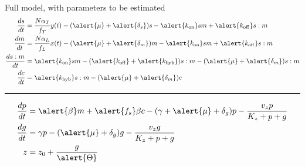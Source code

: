 \documentclass{beamer}
\begin{document}
\small
\begin{frame}{Full model, with parameters to be estimated}
\begin{align} 
\frac{ds}{dt} &= \frac{N\alpha_{T}}{f_{T}} y(t)-(\alert{\mu} + \alert{\delta_{s}})s -\alert{k_{\mathrm{on}}}sm +\alert{k_{\mathrm{off}}}s:m \\
\frac{dm}{dt} &=  \frac{N\alpha_{L}}{f_{L}}x(t)-(\alert{\mu} + \alert{\delta_{m}})m -\alert{k_{\mathrm{on}}}sm +\alert{k_{\mathrm{off}}}s:m  \\
\frac{ds:m}{dt} & = \alert{k_{\mathrm{on}}}sm  - (\alert{k_{\mathrm{off}}}+ \alert{k_{\mathrm{hyb}}})s:m  -(\alert{\mu} + \alert{\delta_{m}} )s:m \\
\frac{dc}{dt} & = \alert{k_{\mathrm{hyb}}}s:m  -(\alert{\mu} + \alert{\delta_{m}})c  
\end{align}
\begin{center}
\rule{0.5\textwidth}{.4pt}
\end{center}
\begin{align}
\frac{dp}{dt} & = \alert{\beta} m +\alert{f_{s}}\beta c -(\gamma + \alert{\mu} + \delta_{g})p - \frac{v_{z}p}{K_{z}+p+g}   \\
\frac{dg}{dt} & = \gamma p - (\alert{\mu} + \delta_{g})g - \frac{v_{z}g}{K_{z}+p+g} \\
z &= z_{0} +\frac{g}{\alert{\Theta}} 
\end{align}
\end{frame}
\normalsize
\end{document}
